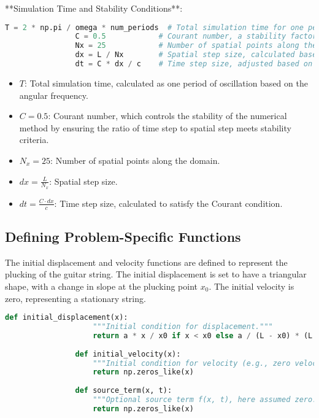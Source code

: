 \documentclass{article}
\begin{document}
			**Simulation Time and Stability Conditions**:
			\begin{lstlisting}[language=Python]
				T = 2 * np.pi / omega * num_periods  # Total simulation time for one period
				C = 0.5            # Courant number, a stability factor for the numerical method
				Nx = 25            # Number of spatial points along the domain
				dx = L / Nx        # Spatial step size, calculated based on domain length and spatial points
				dt = C * dx / c    # Time step size, adjusted based on the Courant number and spatial resolution
			\end{lstlisting}
			
			\begin{itemize}
				\item \( T \): Total simulation time, calculated as one period of oscillation based on the angular frequency.
				\item \( C = 0.5 \): Courant number, which controls the stability of the numerical method by ensuring the ratio of time step to spatial step meets stability criteria.
				\item \( N_x = 25 \): Number of spatial points along the domain.
				\item \( dx = \frac{L}{N_x} \): Spatial step size.
				\item \( dt = \frac{C \cdot dx}{c} \): Time step size, calculated to satisfy the Courant condition.
			\end{itemize}
			
			\subsection{Defining Problem-Specific Functions}
			
			The initial displacement and velocity functions are defined to represent the plucking of the guitar string. The initial displacement is set to have a triangular shape, with a change in slope at the plucking point \( x_0 \). The initial velocity is zero, representing a stationary string.
			
			\begin{lstlisting}[language=Python]
				def initial_displacement(x):
					"""Initial condition for displacement."""
					return a * x / x0 if x < x0 else a / (L - x0) * (L - x)
				
				def initial_velocity(x):
					"""Initial condition for velocity (e.g., zero velocity)."""
					return np.zeros_like(x)
					
				def source_term(x, t):
					"""Optional source term f(x, t), here assumed zero."""
					return np.zeros_like(x)
			\end{lstlisting}
			
\end{document}
